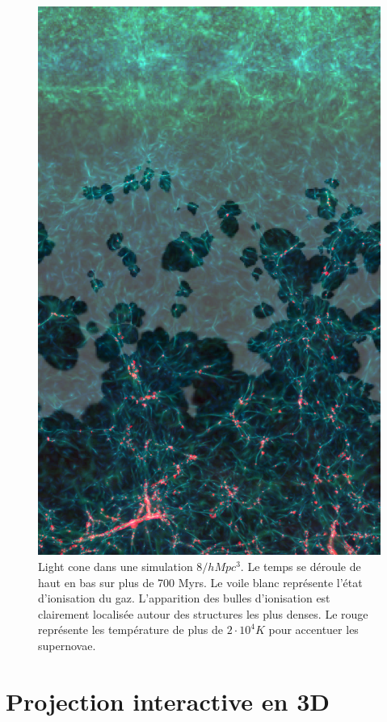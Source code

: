 \begin{figure}[bth]
        \includegraphics[height=.90\textheight]{img/04/frise_wall.png} 
        \caption{Light cone dans une simulation $8/h Mpc ^3$. 
        Le temps se déroule de haut en bas sur plus de 700 Myrs.
        Le voile blanc représente l'état d'ionisation du gaz.
        L'apparition des bulles d'ionisation est clairement localisée autour des structures les plus denses.
        Le rouge représente les température de plus de $2\cdot 10^4K$ pour accentuer les supernovae. 
 }
 		\label{fig:lightcone}
\end{figure}

\section{Projection interactive en 3D}

